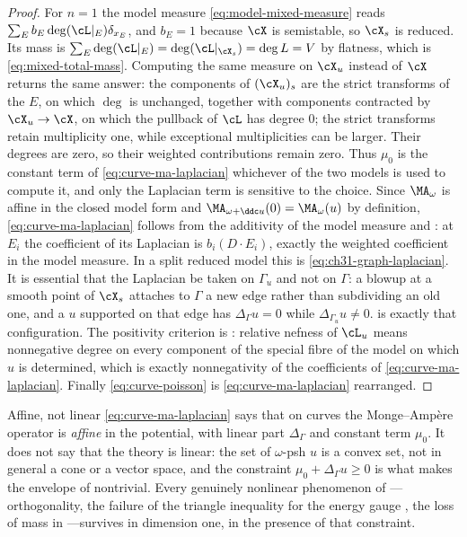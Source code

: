 \begin{proof}
For $n=1$ the model measure \eqref{eq:model-mixed-measure} reads
$\sum_Eb_E\deg(\cL|_E)\delta_{x_E}$, and $b_E=1$ because $\cX$ is
semistable, so $\cX_s$ is reduced.  Its mass is
$\sum_E\deg(\cL|_E)=\deg(\cL|_{\cX_s})=\deg L=V$ by flatness, which is
\eqref{eq:mixed-total-mass}.  Computing the same measure on $\cX_u$
instead of $\cX$ returns the same answer: the components of
$(\cX_u)_s$ are the strict transforms of the $E$, on which
$\deg$ is unchanged, together with components contracted by
$\cX_u\to\cX$, on which the pullback of $\cL$ has degree $0$; the strict transforms retain multiplicity one, while exceptional
multiplicities can be larger.  Their degrees are zero, so their weighted
contributions remain zero.  Thus $\mu_0$ is the
constant term of \eqref{eq:curve-ma-laplacian} whichever of the two models
is used to compute it, and only the Laplacian term is sensitive to the
choice.  Since $\MA_\omega$ is affine in the closed
model form and $\MA_{\omega+\ddc u}(0)=\MA_\omega(u)$ by definition,
\eqref{eq:curve-ma-laplacian} follows from the additivity of the model
measure and : at $E_i$ the coefficient
of its Laplacian is $b_i(D\cdot E_i)$, exactly the weighted coefficient
in the model measure.  In a split reduced model this is
\eqref{eq:ch31-graph-laplacian}.  It is
essential that the Laplacian be taken on $\Gamma_u$ and not on
$\Gamma$: a blowup at a smooth point of $\cX_s$ attaches to $\Gamma$
a new edge rather than subdividing an old one, and a $u$ supported on
that edge has $\Delta_\Gamma u=0$ while $\Delta_{\Gamma_u}u\neq0$.
 is exactly that configuration.  The positivity
criterion is
: relative nefness of $\cL_u$ means
nonnegative degree on every component of the special fibre of the model on
which $u$ is determined, which is exactly nonnegativity of the
coefficients of \eqref{eq:curve-ma-laplacian}.  Finally
\eqref{eq:curve-poisson} is \eqref{eq:curve-ma-laplacian} rearranged.
\end{proof}

\begin{warning}{Affine, not linear}
\eqref{eq:curve-ma-laplacian} says that on curves the Monge--Amp\`ere
operator is \emph{affine} in the potential, with linear part
$\Delta_\Gamma$ and constant term $\mu_0$.  It does not say that the
theory is linear: the set of $\omega$-psh $u$ is a convex set,
not in general a cone or a vector space, and the constraint
$\mu_0+\Delta_\Gamma u\geq0$ is what makes the envelope of
 nontrivial.  Every genuinely nonlinear phenomenon
of ---orthogonality, the failure of the triangle inequality
for the energy gauge , the loss of mass in
---survives in dimension one, in the presence
of that constraint.
\end{warning}

